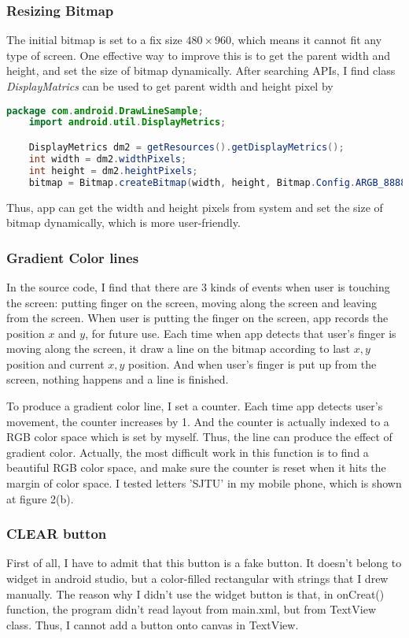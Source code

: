 \documentclass{article}
\begin{document}
\subsubsection{Resizing Bitmap}
The initial bitmap is set to a fix size $480\times 960$, which means it cannot fit any type of screen. One effective way to improve this is to get the parent width and height, and set the size of bitmap dynamically. After searching APIs, I find class \emph{DisplayMatrics} can be used to get parent width and height pixel by
\begin{lstlisting}[language=Java]
    package com.android.DrawLineSample;
    import android.util.DisplayMetrics;

    DisplayMetrics dm2 = getResources().getDisplayMetrics();
    int width = dm2.widthPixels;
    int height = dm2.heightPixels;
    bitmap = Bitmap.createBitmap(width, height, Bitmap.Config.ARGB_8888);
\end{lstlisting}

Thus, app can get the width and height pixels from system and set the size of bitmap dynamically, which is more user-friendly.

\subsubsection{Gradient Color lines}
In the source code, I find that there are 3 kinds of events when user is touching the screen: putting finger on the screen, moving along the screen and leaving from the screen. When user is putting the finger on the screen, app records the position $x$ and $y$, for future use. Each time when app detects that user's finger is moving along the screen, it draw a line on the bitmap according to last $x,y$ position and current $x,y$ position. And when user's finger is put up from the screen, nothing happens and a line is finished.

To produce a gradient color line, I set a counter. Each time app detects user's movement, the counter increases by 1. And the counter is actually indexed to a RGB color space which is set by myself. Thus, the line can produce the effect of gradient color. Actually, the most difficult work in this function is to find a beautiful RGB color space, and make sure the counter is reset when it hits the margin of color space. I tested letters 'SJTU' in my mobile phone, which is shown at figure 2(b).

\subsubsection{CLEAR button}
First of all, I have to admit that this button is a fake button. It doesn't belong to widget in android studio, but a color-filled rectangular with strings that I drew manually. The reason why I didn't use the widget button is that, in onCreat() function, the program didn't read layout from main.xml, but from TextView class. Thus, I cannot add a button onto canvas in TextView.
\end{document}

